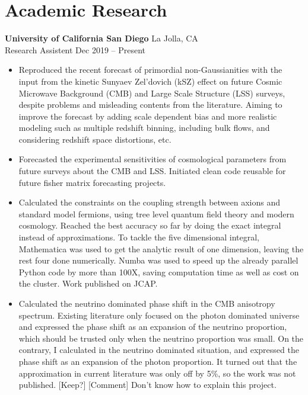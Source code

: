 \documentclass[letterpaper,12pt]{article}
\newenvironment{zitemize}{
\begin{itemize} \vspace{-.9em}\itemsep 0pt \parskip 0pt}
{\end{itemize}\vspace{-.5em}}
\newcommand{\keepornot}[1]{{\color{red} #1 [Keep?]}}
\newcommand{\comment}[1]{{\color{Green} [Comment] #1}}
\begin{document}
\section{Academic Research}
\textbf{University of California San Diego} \hfill La Jolla, CA \\
Research Assistent \hfill Dec 2019 -- Present \\
\begin{zitemize}
    \item Reproduced the recent forecast of primordial non-Gaussianities with the input from the kinetic Sunyaev Zel'dovich (kSZ) effect on future Cosmic Microwave Background (CMB) and Large Scale Structure (LSS) surveys, despite problems and misleading contents from the literature. Aiming to improve the forecast by adding scale dependent bias and more realistic modeling such as multiple redshift binning, including bulk flows, and considering redshift space distortions, etc.
    \item Forecasted the experimental sensitivities of cosmological parameters from future surveys about the CMB and LSS. Initiated clean code reusable for future fisher matrix forecasting projects. 
    \item Calculated the constraints on the coupling strength between axions and standard model fermions, using tree level quantum field theory and modern cosmology. Reached the best accuracy so far by doing the exact integral instead of approximations. To tackle the five dimensional integral, Mathematica was used to get the analytic result of one dimension, leaving the rest four done numerically. Numba was used to speed up the already parallel Python code by more than 100X, saving computation time as well as cost on the cluster. Work published on JCAP.
    \item Calculated the neutrino dominated phase shift in the CMB anisotropy spectrum. \keepornot{Existing literature only focused on the photon dominated universe and expressed the phase shift as an expansion of the neutrino proportion, which should be trusted only when the neutrino proportion was small. On the contrary, I calculated in the neutrino dominated situation, and expressed the phase shift as an expansion of the photon proportion. It turned out that the approximation in current literature was only off by 5\%, so the work was not published.} \comment{Don't know how to explain this project.}
\end{zitemize}
\end{document}
